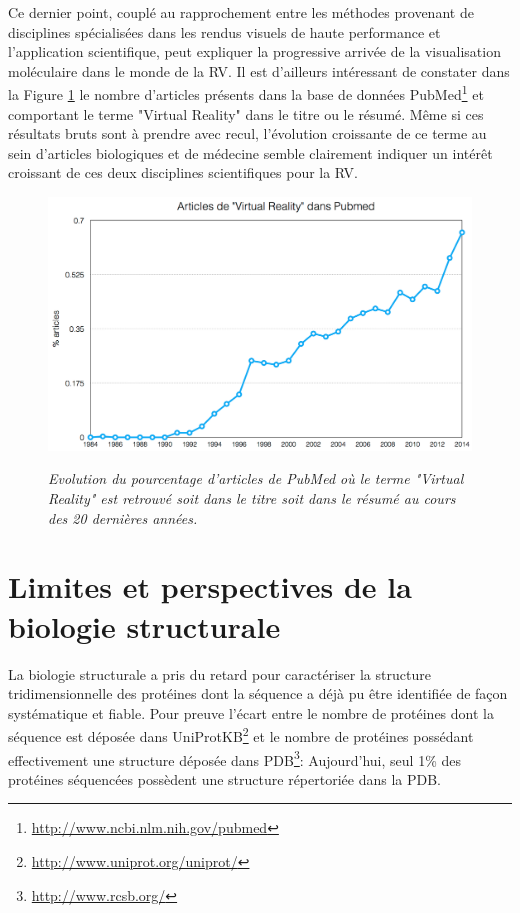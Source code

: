 Ce dernier point, couplé au rapprochement entre les méthodes provenant de disciplines spécialisées dans les rendus visuels de haute performance et l'application scientifique, peut expliquer la progressive arrivée de la visualisation moléculaire dans le monde de la RV. Il est d'ailleurs intéressant de constater dans la Figure \ref{Fig:VR_pubmed_trend} le nombre d'articles présents dans la base de données PubMed\footnote{\url{http://www.ncbi.nlm.nih.gov/pubmed}} et comportant le terme "Virtual Reality" dans le titre ou le résumé. Même si ces résultats bruts sont à prendre avec recul, l'évolution croissante de ce terme au sein d'articles biologiques et de médecine semble clairement indiquer un intérêt croissant de ces deux disciplines scientifiques pour la RV.

\begin{figure}
  \centering
  {\includegraphics[width=.75\linewidth]{./figures/ch1/VR_pubmed_trend.png}}
    \caption{{\it Evolution du pourcentage d'articles de PubMed où le terme "Virtual Reality" est retrouvé soit dans le titre soit dans le résumé au cours des 20 dernières années.}}
  \label{Fig:VR_pubmed_trend}
  \hspace{0.3cm}
\end{figure}

\section{Limites et perspectives de la biologie structurale} \label{limits_persp_bio_struct}

La biologie structurale a pris du retard pour caractériser la structure tridimensionnelle des protéines dont la séquence a déjà pu être identifiée de façon systématique et fiable. Pour preuve l'écart entre le nombre de protéines dont la séquence est déposée dans UniProtKB\footnote{\url{http://www.uniprot.org/uniprot/}} et le nombre de protéines possédant effectivement une structure déposée dans PDB\footnote{\url{http://www.rcsb.org/}}: Aujourd'hui, seul 1\% des protéines séquencées possèdent une structure répertoriée dans la PDB. 

